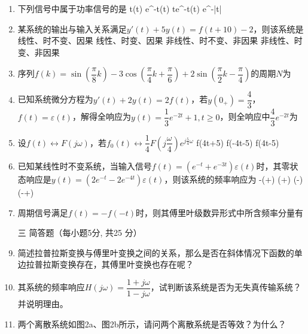 \documentclass[11pt,twoside]{ctexart}
\begin{document}
\begin{enumerate}[leftmargin=0em]
\begin{center}
{图1}
\end{center}
\item 下列信号中属于功率信号的是
\xxs%
{\cos t\varepsilon(t)}%
{e^{-t}\varepsilon(t)}%
{te^{-t}\varepsilon(t)}%
{e^{-|t|}}
\item 某系统的输出与输入关系满足$y'(t)+5y(t)=f(t+10)-2$，则该系统是
\xx%
{线性、时不变、因果}%
{线性、时变、因果}%
{非线性、时不变、非因果}%
{非线性、时变、非因果}
\item 序列$f(k)=\sin\left(\dfrac{\pi}{8}k\right)-3\cos\left(\dfrac{\pi}{4}k+\dfrac{\pi}{6}\right)+2\sin\left(\dfrac{\pi}{2}k-\dfrac{\pi}{4}\right)$的周期$N$为

\item 已知系统微分方程为$y'(t)+2y(t)=2f(t)$，若$y(0_+)=\dfrac{4}{3}$，$f(t)=\varepsilon(t)$，解得全响应为$y(t)=\dfrac{1}{3}e^{-2t}+1,t\geqslant 0$，则全响应中$\dfrac{4}{3}e^{-2t}$为
\item 设$f(t)\leftrightarrow F(j\omega)$，若$f_0(t)\leftrightarrow \dfrac{1}{4}F\left(j\dfrac{\omega}{4}\right)e^{j\frac{5}{4}\omega}$
%
{f(4t+5)}%
{f(-4t-5)}%
{f(4t-5)}
\vspace{3em}
\item 已知某线性时不变系统，当输入信号$f(t)=(e^{-t}+e^{-3t})\varepsilon(t)$时，其零状态响应是$y(t)=(2e^{-t}-2e^{-4t})\varepsilon(t)$，则该系统的频率响应为
\xxs
{-\left(+\right)}
{\left(+\right)}
{\left(-\right)}
{\left(-+\right)}
\vspace*{3em}
\item 周期信号满足$f(t)=-f(-t)$时，则其傅里叶级数异形式中所含频率分量有
\vspace{3em}\setlength{\itemsep}{0em}\setcounter{enumi}{0}
\item[\kaishu{}三]{\kaishu{}简答题（每小题5分, 共25 分）}%
\item 简述拉普拉斯变换与傅里叶变换之间的关系，那么是否在斜体情况下函数的单边拉普拉斯变换存在，其傅里叶变换也存在呢？\setlength{\itemsep}{8em}
\item 其系统的频率响应$H(j\omega)=\dfrac{1+j\omega}{1-j\omega}$，试判断该系统是否为无失真传输系统？并说明理由。
\item 两个离散系统如图2a、图2b所示，请问两个离散系统是否等效？为什么？

\end{enumerate}
\end{document}
